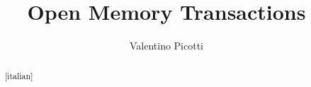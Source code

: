 \documentclass{thesis}
\title{Open Memory Transactions}
\author{Valentino Picotti}
\begin{document}
\maketitle

\begin{dedication}

\end{dedication}

\begin{abstract}[italian]

\end{abstract}

\begin{abstract}

\end{abstract}

\begin{acknowledgements}[italian]

\end{acknowledgements}

\tableofcontents

\mainmatter





\backmatter

\printindex
\end{document}
